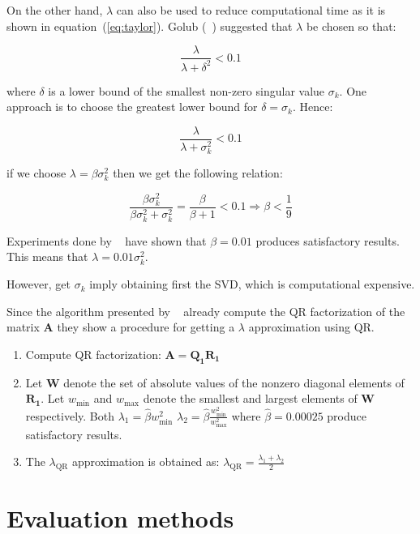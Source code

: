 On the other hand, $\lambda$ can also be used to reduce computational time as it
is shown in equation~(\ref{eq:taylor}). Golub (~\cite{golub1965}) suggested that
$\lambda$ be chosen so that:

\[
\frac{\lambda}{\lambda + \delta^2} < 0.1
\]

\noindent where $\delta$ is a lower bound of the smallest non-zero singular
value $\sigma_k$. One approach is to choose the greatest lower bound for
$\delta=\sigma_k$. Hence:

\[
\frac{\lambda}{\lambda + \sigma_k^2} < 0.1
\]

\noindent if we choose $\lambda=\beta \sigma_k^2$ then we get the following
relation:


\[
\frac{\beta \sigma_k^2}{\beta \sigma_k^2 + \sigma_k^2} =
\frac{\beta}{\beta+1} < 0.1 \Rightarrow \beta < \frac{1}{9}  
\]

Experiments done by ~\cite{coleman+sun2010} have shown that $\beta = 0.01$
produces satisfactory results. This means that $\lambda = 0.01 \sigma_k^2$.

However, get $\sigma_k$ imply obtaining first the SVD, which is
computational expensive.

Since the algorithm presented by ~\cite{coleman+sun2010} already compute the QR
factorization of the matrix $\mathbf{A}$ they show a procedure for getting
a $\lambda$ approximation using QR.

\begin{enumerate}
\item Compute QR factorization: $\mathbf{A} = \mathbf{Q_1R_1}$
\item Let $\mathbf{W}$ denote the set of absolute values of the nonzero diagonal
elements of $\mathbf{R_1}$. Let $w_{\text{min}}$ and $w_{\text{max}}$ denote the
smallest and largest elements of $\mathbf{W}$ respectively. Both 
$\lambda_1 = \hat{\beta} w_{\text{min}}^2$
$\lambda_2 = \hat{\beta} \frac{w_{\text{min}}^2}{w_{\text{max}}^2}$ where
$\hat{\beta}=0.00025$ produce satisfactory results.
\item The $\lambda_{\text{QR}}$ approximation is obtained as:
$\lambda_{\text{QR}} = \frac{\lambda_1 + \lambda_2}{2}$  
\end{enumerate}



\section{Evaluation methods} \label{sec:evaluation}

